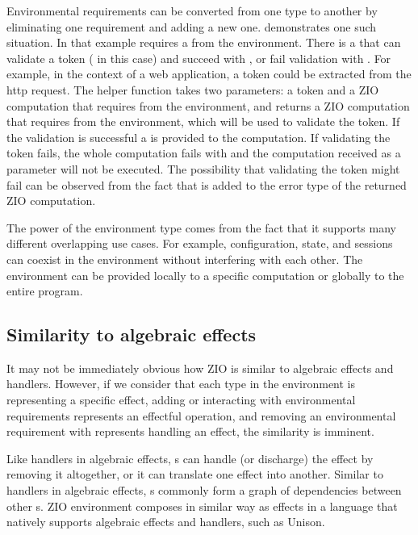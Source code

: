 Environmental requirements can be converted from one type to another by eliminating one requirement and adding a new one.  demonstrates one such situation. In that example  requires a  from the environment. There is a  that can validate a token ( in this case) and succeed with , or fail validation with . For example, in the context of a web application, a token could be extracted from the http request. The helper function  takes two parameters: a token and a ZIO computation that requires  from the environment, and returns a ZIO computation that requires  from the environment, which will be used to validate the token. If the validation is successful a  is provided to the computation. If validating the token fails, the whole computation fails with  and the computation received as a parameter will not be executed. The possibility that validating the token might fail can be observed from the fact that   is added to the error type of the returned ZIO computation.



The power of the environment type comes from the fact that it supports many different overlapping use cases. For example, configuration, state, and sessions can coexist in the environment without interfering with each other. The environment can be provided locally to a specific computation or globally to the entire program.


\subsection{Similarity to algebraic effects}
It may not be immediately obvious how ZIO is similar to algebraic effects and handlers.
However, if we consider that each type in the environment is representing a specific effect, adding or interacting with environmental requirements represents an effectful operation, and removing an environmental requirement with  represents handling an effect, the similarity is imminent.

Like handlers in algebraic effects, s can handle (or discharge) the effect by removing it altogether, or it can translate one effect into another. Similar to handlers in algebraic effects, s commonly form a graph of dependencies between other s. ZIO environment composes in similar way as effects in a language that natively supports algebraic effects and handlers, such as Unison.

